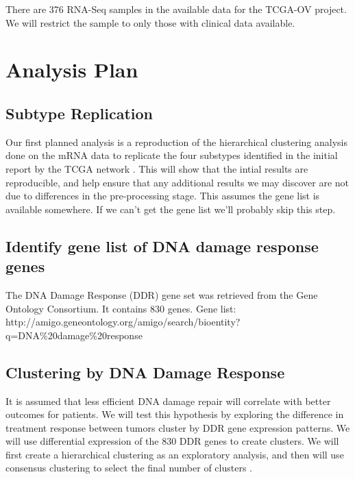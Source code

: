 \documentclass{article}
\begin{document}
There are 376 RNA-Seq samples in the available data for the TCGA-OV project. We will restrict the sample to only those with clinical data available. 



\section{Analysis Plan}

\subsection{Subtype Replication}
   Our first planned analysis is a reproduction of the hierarchical clustering analysis\cite{eisen_cluster_1998} done on the mRNA data to replicate the four substypes identified in the initial report by the TCGA network \cite{cancer2011integrated}. This will show that the intial results are reproducible, and help ensure that any additional results we may discover are not due to differences in the pre-processing stage. This assumes the gene list is available somewhere. If we can't get the gene list we'll probably skip this step. 
   
\subsection{Identify gene list of DNA damage response genes}

The DNA Damage Response (DDR) gene set was retrieved from the Gene Ontology Consortium.  It contains 830 genes.
Gene list: http://amigo.geneontology.org/amigo/search/bioentity?q=DNA\%20damage\%20response

\subsection{Clustering by DNA Damage Response}
  It is assumed that less efficient DNA damage repair will correlate with better outcomes for patients. We will test this hypothesis by exploring the difference in treatment response between tumors cluster by DDR gene expression patterns. We will use differential expression of the 830 DDR genes to create clusters. We will first create a hierarchical clustering as an exploratory analysis, and then will use consensus clustering to select the final number of clusters \cite{monti_consensus_2003}. 
\end{document}
